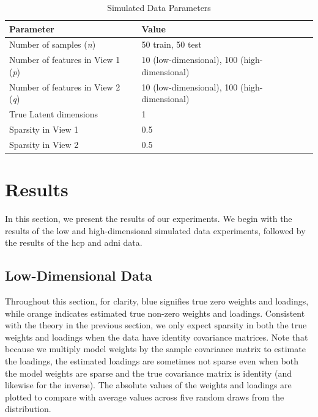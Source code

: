 \begin{table}
\centering
\caption{Simulated Data Parameters}
\begin{tabular}{| l | l |}
\hline
\textbf{Parameter} & \textbf{Value} \\
\hline
Number of samples (\textit{n}) & 50 train, 50 test \\
Number of features in View 1 (\textit{p}) & 10 (low-dimensional), 100 (high-dimensional) \\
Number of features in View 2 (\textit{q}) & 10 (low-dimensional), 100 (high-dimensional) \\
True Latent dimensions & 1 \\
Sparsity in View 1 & 0.5 \\
Sparsity in View 2 & 0.5 \\
\hline
\end{tabular}\label{tab:simulated-data-parameters}
\end{table}

\section{Results}

In this section, we present the results of our experiments.
We begin with the results of the low and high-dimensional simulated data experiments, followed by the results of the \acrshort{hcp} and \acrshort{adni} data.

\subsection{Low-Dimensional Data}

Throughout this section, for clarity, blue signifies true zero weights and loadings, while orange indicates estimated true non-zero weights and loadings.
Consistent with the theory in the previous section, we only expect sparsity in both the true weights and \gls{loadings} when the data have identity covariance matrices.
Note that because we multiply model weights by the sample covariance matrix to estimate the loadings, the estimated \gls{loadings} are sometimes not sparse even when both the model weights are sparse and the true covariance matrix is identity (and likewise for the inverse).
The absolute values of the weights and \gls{loadings} are plotted to compare with average values across five random draws from the distribution.

